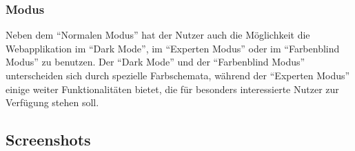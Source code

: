 \subsubsection{Modus}
Neben dem \enquote{Normalen Modus} hat der Nutzer auch die Möglichkeit die Webapplikation im \enquote{Dark Mode}, im \enquote{Experten Modus} oder im \enquote{Farbenblind Modus} zu benutzen.
Der \enquote{Dark Mode} und der \enquote{Farbenblind Modus} unterscheiden sich durch spezielle Farbschemata, während der \enquote{Experten Modus} einige weiter Funktionalitäten bietet, die für besonders interessierte Nutzer zur Verfügung stehen soll. 

\subsection{Screenshots}
\label{Screenshots}

